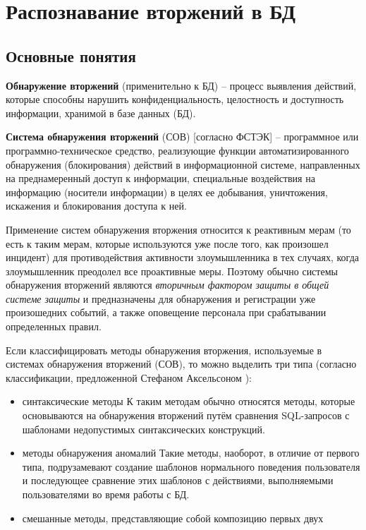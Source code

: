 \section{Распознавание вторжений в БД}

\subsection{Основные понятия}

\textbf{Обнаружение вторжений} (применительно к БД) -- процесс выявления действий, 
которые способны нарушить конфиденциальность, целостность и доступность информации, 
хранимой в базе данных (БД).

\textbf{Система обнаружения вторжений} (СОВ) [согласно ФСТЭК] -- программное или программно-техническое 
средство, реализующие функции автоматизированного обнаружения (блокирования) действий в информационной системе, 
направленных на преднамеренный доступ к информации, специальные воздействия на информацию (носители информации) 
в целях ее добывания, уничтожения, искажения и блокирования доступа к ней.

Применение систем обнаружения вторжения относится к реактивным мерам (то есть к таким мерам, которые 
используются уже после того, как произошел инцидент) для противодействия активности злоумышленника в тех 
случаях, когда злоумышленник преодолел все проактивные меры. Поэтому обычно системы обнаружения вторжений 
являются \textit{вторичным фактором защиты в общей системе защиты} и предназначены для обнаружения и регистрации
уже произошедних событий, а также оповещение персонала при срабатывании определенных правил.

Если классифицировать методы обнаружения вторжения, используемые в системах обнаружения вторжений (СОВ), 
то можно выделить три типа (согласно классификации, предложенной Стефаном Аксельсоном \autocite{IDSClassification}):
\begin{itemize}
	\item синтаксические методы 
		К таким методам обычно относятся методы, которые основываются на обнаружения вторжений 
		путём сравнения SQL-запросов с шаблонами недопустимых синтаксических конструкций.
	\item методы обнаружения аномалий
		Такие методы, наоборот, в отличие от первого типа, подрузамевают создание шаблонов нормального 
		поведения пользователя и последующее сравнение этих шаблонов с действиями, выполняемыми пользователями 
		во время работы с БД.
	\item смешанные методы, представляющие собой композицию первых двух
\end{itemize}

